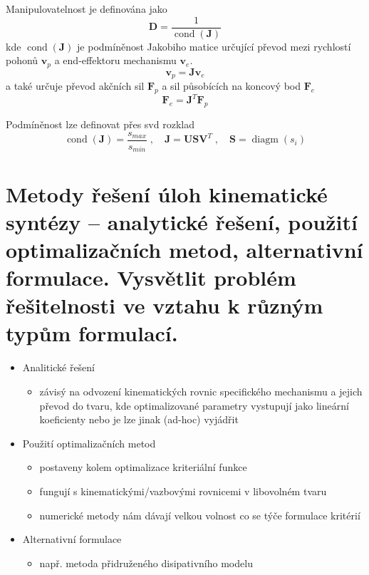\documentclass{article}
\begin{document}
	Manipulovatelnost je definována jako
	\begin{equation}
		\bm{D} = \frac{1}{\operatorname{cond}(\bm{J})}
	\end{equation}
	kde $\operatorname{cond}(\bm{J})$ je podmíněnost Jakobiho matice určující převod mezi rychlostí pohonů $\bm{v}_p$ a end-effektoru mechanismu $\bm{v}_e$.
	\begin{equation}
		\bm{v}_p = \bm{J} \bm{v}_e
	\end{equation}
	a také určuje převod akčních sil $\bm{F}_p$ a sil působících na koncový bod $\bm{F}_e$
	\begin{equation}
		\bm{F}_e = \bm{J}^T \bm{F}_p
	\end{equation}

	Podmíněnost lze definovat přes svd rozklad
	\begin{equation}
		\operatorname{cond}(\bm{J}) = \frac{s_{max}}{s_{min}}
		\;,\quad 
		\bm{J} = \bm{U} \bm{S} \bm{V}^T
		\;,\quad 
		\bm{S} = \operatorname{diagm}(s_i)
	\end{equation}

	\section{Metody řešení úloh kinematické syntézy – analytické řešení, použití optimalizačních metod, alternativní formulace. Vysvětlit problém řešitelnosti ve vztahu k různým typům formulací.}

	\begin{itemize}
	\item Analitické řešení
	\begin{itemize}
		\item závisý na odvození kinematických rovnic specifického mechanismu a jejich převod do tvaru, kde optimalizované parametry vystupují jako lineární koeficienty nebo je lze jinak (ad-hoc) vyjádřit
	\end{itemize}
	\item Použití optimalizačních metod
		\begin{itemize}
		\item postaveny kolem optimalizace kriteriální funkce
		\item fungují s kinematickými/vazbovými rovnicemi v libovolném tvaru
		\item numerické metody nám dávají velkou volnost co se týče formulace kritérií
		\end{itemize}
	\item Alternativní formulace
		\begin{itemize}
		\item např. metoda přidruženého disipativního modelu
		\end{itemize}
	\end{itemize}
\end{document}
